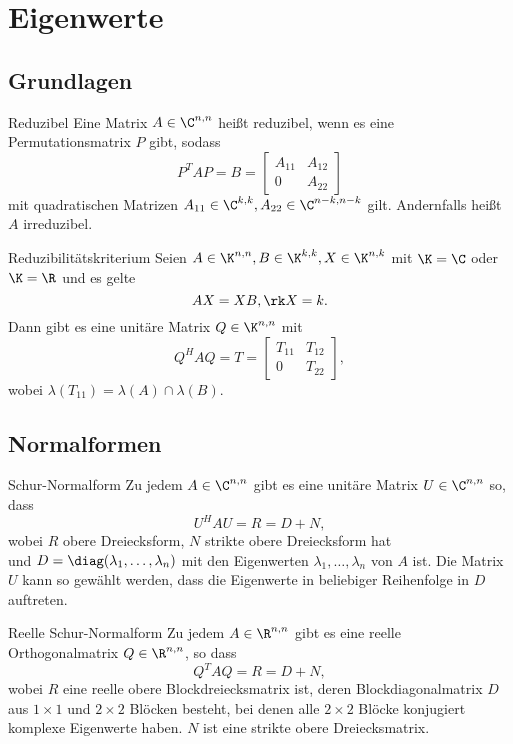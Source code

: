 \section{Eigenwerte}
\subsection{Grundlagen}

\begin{karte}{Reduzibel}
    Eine Matrix \( A \in \C^{n,n} \) heißt reduzibel, wenn es eine Permutationsmatrix \(P\)
    gibt, sodass 
    \[ P^T A P = B = \left[ \begin{matrix} A_{11} & A_{12} \\ 0 & A_{22} \end{matrix} \right] \]
    mit quadratischen Matrizen \( A_{11} \in \C^{k,k}, A_{22} \in \C^{n-k,n-k} \) gilt. 
    Andernfalls heißt \( A \) irreduzibel.
\end{karte}

\begin{karte}{Reduzibilitätskriterium}
    Seien \( A \in \K^{n,n}, B\in \K^{k,k}, X \in \K^{n,k} \) 
    mit \( \K = \C \) oder \(\K = \R \) und es gelte 
    \[ AX = XB, \rk X = k. \]
    Dann gibt es eine unitäre Matrix \(Q \in \K^{n,n}\) mit 
    \[ Q^H A Q = T = \left[ \begin{matrix}
        T_{11} & T_{12} \\ 0 & T_{22}
    \end{matrix} \right], \]
    wobei \( \lambda(T_{11}) = \lambda(A) \cap \lambda(B) \).
\end{karte}

\subsection{Normalformen}

\begin{karte}{Schur-Normalform}
    Zu jedem \(A\in \C^{n,n}\) gibt es eine unitäre Matrix \(U \in \C^{n,n}\) so, dass 
    \[ U^H A U = R = D + N, \]
    wobei \(R\) obere Dreiecksform, \(N\) strikte obere Dreiecksform hat \\ 
    und \(D = \diag(\lambda_1, \ldots, \lambda_n)\) mit den Eigenwerten \( \lambda_1, \ldots, \lambda_n \)
    von \(A\) ist. Die Matrix \(U\) kann so gewählt werden, dass die Eigenwerte in beliebiger 
    Reihenfolge in \(D\) auftreten.
\end{karte}

\begin{karte}{Reelle Schur-Normalform}
    Zu jedem \( A\in \R^{n,n} \) gibt es eine reelle Orthogonalmatrix \(Q\in \R^{n,n}\), 
    so dass 
    \[ Q^T A Q = R = D + N,\]
    wobei \(R\) eine reelle obere Blockdreiecksmatrix ist, deren Blockdiagonalmatrix \(D\) 
    aus \(1\times 1\) und \(2\times 2\) Blöcken besteht, bei denen alle \(2\times 2\) Blöcke 
    konjugiert komplexe Eigenwerte haben. \(N\) ist eine strikte obere Dreiecksmatrix.
\end{karte}

